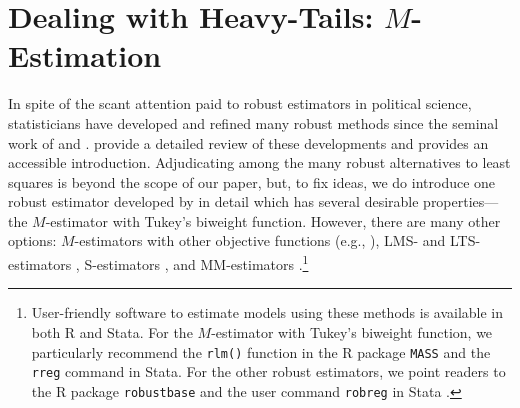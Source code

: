 \documentclass[12pt]{article}
\begin{document}
\section*{Dealing with Heavy-Tails: $M$-Estimation}

In spite of the scant attention paid to robust estimators in political science, statisticians have developed and refined many robust methods since the seminal work of \cite{Box1953} and \cite{Huber1964}. 
\cite{HuberRonchetti2009} provide a detailed review of these developments and \cite{Anderson2008} provides an accessible introduction. 
Adjudicating among the many robust alternatives to least squares is beyond the scope of our paper, but, to fix ideas, we do introduce one robust estimator developed by \cite{BeatonTukey1974} in detail which has several desirable properties---the $M$-estimator with Tukey's biweight function. 
However, there are many other options: $M$-estimators with other objective functions (e.g., \citealt{Huber1973}), LMS- and LTS-estimators \citep{Rousseeuw1984}, S-estimators \citep{RousseeuwYohai1984}, and MM-estimators \citep{Yohai1987}.\footnote{User-friendly software to estimate models using these methods is available in both R and Stata. For the $M$-estimator with Tukey's biweight function, we particularly recommend the \texttt{rlm()} function in the R package \texttt{MASS} \citep{MASS} and the \texttt{rreg} command in Stata. For the other robust estimators, we point readers to the R package \texttt{robustbase} \citep{Rousseeuwetal2016} and the user command \texttt{robreg} in Stata \citep{Jann2010}.}
\end{document}
